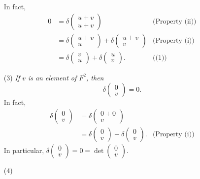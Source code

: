 \documentclass{article}
\begin{document}
\begin{enumerate}
In fact,
\begin{align*}
0
&= \delta\begin{pmatrix} u+v \\ u+v \end{pmatrix}
  &\text{(Property (ii))} \\
&= \delta\begin{pmatrix} u+v \\ u \end{pmatrix}
   + \delta\begin{pmatrix} u+v \\ v \end{pmatrix}
  &\text{(Property (i))} \\
&= \delta\begin{pmatrix} v \\ u \end{pmatrix}
   + \delta\begin{pmatrix} u \\ v \end{pmatrix}.
  &\text{((1))}
\end{align*}
\item[(3)]
\emph{If $v$ is an element of $F^2$, then
$$\delta\begin{pmatrix} 0 \\ v \end{pmatrix} = 0.$$}
In fact,
\begin{align*}
\delta\begin{pmatrix} 0 \\ v \end{pmatrix}
&= \delta\begin{pmatrix} 0+0 \\ v \end{pmatrix} \\
&= \delta\begin{pmatrix} 0 \\ v \end{pmatrix}
   + \delta\begin{pmatrix} 0 \\ v \end{pmatrix}.
  &\text{(Property (i))}
\end{align*}
In particular,
$\delta\begin{pmatrix} 0 \\ v \end{pmatrix} = 0
= \det\begin{pmatrix} 0 \\ v \end{pmatrix}$.
\item[(4)]

\end{enumerate}
\end{document}
